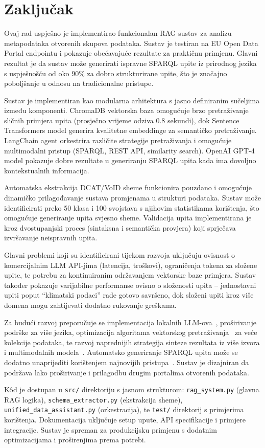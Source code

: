 \chapter{Zaključak}
\label{ch:conclusion}


Ovaj rad uspješno je implementirao funkcionalan RAG sustav za analizu metapodataka otvorenih skupova podataka. Sustav je testiran na EU Open Data Portal endpointu i pokazuje obećavajuće rezultate za praktičnu primjenu. Glavni rezultat je da sustav može generirati ispravne SPARQL upite iz prirodnog jezika s uspješnošću od oko 90\% za dobro strukturirane upite, što je značajno poboljšanje u odnosu na tradicionalne pristupe.

Sustav je implementiran kao modularna arhitektura s jasno definiranim sučeljima između komponenti. ChromaDB vektorska baza omogućuje brzo pretraživanje sličnih primjera upita (prosječno vrijeme odziva 0.8 sekundi), dok Sentence Transformers model generira kvalitetne embeddinge za semantičko pretraživanje. LangChain agent orkestrira različite strategije pretraživanja i omogućuje multimodalni pristup (SPARQL, REST API, similarity search). OpenAI GPT-4 model pokazuje dobre rezultate u generiranju SPARQL upita kada ima dovoljno kontekstualnih informacija.

Automatska ekstrakcija DCAT/VoID sheme funkcionira pouzdano i omogućuje dinamičko prilagođavanje sustava promjenama u strukturi podataka. Sustav može identificirati preko 50 klasa i 100 svojstava s njihovim statistikama korištenja, što omogućuje generiranje upita svjesno sheme. Validacija upita implementirana je kroz dvostupanjski proces (sintaksna i semantička provjera) koji sprječava izvršavanje neispravnih upita.

Glavni problemi koji su identificirani tijekom razvoja uključuju ovisnost o komercijalnim LLM API-jima (latencija, troškovi), ograničenja tokena za složene upite, te potrebu za kontinuiranim održavanjem vektorske baze primjera. Sustav također pokazuje varijabilne performanse ovisno o složenosti upita -- jednostavni upiti poput ``klimatski podaci'' rade gotovo savršeno, dok složeni upiti kroz više domena mogu zahtijevati dodatno rukovanje greškama.

Za budući razvoj preporučuje se implementacija lokalnih LLM-ova~\cite{wang2023efficient}, proširivanje podrške za više jezika, optimizacija algoritama vektorskog pretraživanja~\cite{wang2023vector} za veće kolekcije podataka, te razvoj naprednijih strategija sinteze rezultata iz više izvora i multimodalnih modela~\cite{liu2023survey}. Automatsko generiranje SPARQL upita može se dodatno unaprijediti korištenjem najnovijih pristupa~\cite{emonet2024llm}. Sustav je dizajniran da podržava lako proširivanje i prilagodbu drugim portalima otvorenih podataka.

Kôd je dostupan u \texttt{src/} direktoriju s jasnom strukturom: \texttt{rag\_system.py} (glavna RAG logika), \texttt{schema\_extractor.py} (ekstrakcija sheme), \texttt{unified\_data\_assistant.py} (orkestracija), te \texttt{test/} direktorij s primjerima korištenja. Dokumentacija uključuje setup upute, API specifikacije i primjere integracije. Sustav je spreman za produkcijsku primjenu s dodatnim optimizacijama i proširenjima prema potrebi. 